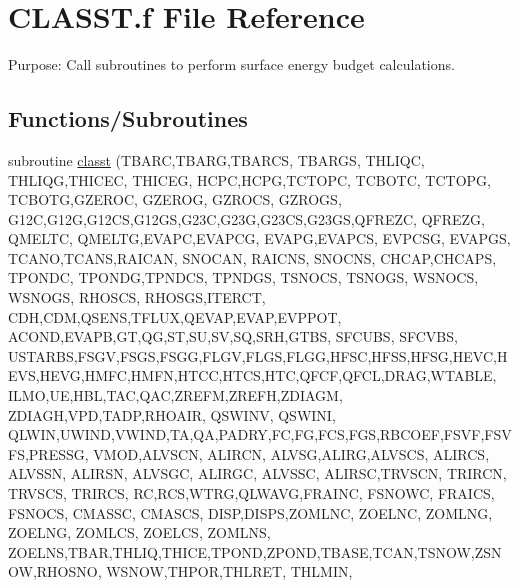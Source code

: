 \hypertarget{CLASST_8f}{}\section{C\+L\+A\+S\+S\+T.\+f File Reference}
\label{CLASST_8f}


Purpose\+: Call subroutines to perform surface energy budget calculations.  


\subsection*{Functions/\+Subroutines}
\begin{DoxyCompactItemize}
\item 
subroutine \hyperlink{CLASST_8f_aae7caf500dbc44213c77f3ff2846253f}{classt} (T\+B\+A\+R\+C,T\+B\+A\+R\+G,T\+B\+A\+R\+C\+S, T\+B\+A\+R\+G\+S, T\+H\+L\+I\+Q\+C, T\+H\+L\+I\+Q\+G,T\+H\+I\+C\+E\+C, T\+H\+I\+C\+E\+G, H\+C\+P\+C,H\+C\+P\+G,T\+C\+T\+O\+P\+C, T\+C\+B\+O\+T\+C, T\+C\+T\+O\+P\+G, T\+C\+B\+O\+T\+G,G\+Z\+E\+R\+O\+C, G\+Z\+E\+R\+O\+G, G\+Z\+R\+O\+C\+S, G\+Z\+R\+O\+G\+S, G12\+C,G12\+G,G12\+C\+S,G12\+G\+S,G23\+C,G23\+G,G23\+C\+S,G23\+G\+S,Q\+F\+R\+E\+Z\+C, Q\+F\+R\+E\+Z\+G, Q\+M\+E\+L\+T\+C, Q\+M\+E\+L\+T\+G,E\+V\+A\+P\+C,E\+V\+A\+P\+C\+G, E\+V\+A\+P\+G,E\+V\+A\+P\+C\+S, E\+V\+P\+C\+S\+G, E\+V\+A\+P\+G\+S, T\+C\+A\+N\+O,T\+C\+A\+N\+S,R\+A\+I\+C\+A\+N, S\+N\+O\+C\+A\+N, R\+A\+I\+C\+N\+S, S\+N\+O\+C\+N\+S, C\+H\+C\+A\+P,C\+H\+C\+A\+P\+S, T\+P\+O\+N\+D\+C, T\+P\+O\+N\+D\+G,T\+P\+N\+D\+C\+S, T\+P\+N\+D\+G\+S, T\+S\+N\+O\+C\+S, T\+S\+N\+O\+G\+S, W\+S\+N\+O\+C\+S, W\+S\+N\+O\+G\+S, R\+H\+O\+S\+C\+S, R\+H\+O\+S\+G\+S,I\+T\+E\+R\+C\+T, C\+D\+H,C\+D\+M,Q\+S\+E\+N\+S,T\+F\+L\+U\+X,Q\+E\+V\+A\+P,E\+V\+A\+P,E\+V\+P\+P\+O\+T, A\+C\+O\+N\+D,E\+V\+A\+P\+B,G\+T,Q\+G,S\+T,S\+U,S\+V,S\+Q,S\+R\+H,G\+T\+B\+S, S\+F\+C\+U\+B\+S, S\+F\+C\+V\+B\+S, U\+S\+T\+A\+R\+B\+S,F\+S\+G\+V,F\+S\+G\+S,F\+S\+G\+G,F\+L\+G\+V,F\+L\+G\+S,F\+L\+G\+G,H\+F\+S\+C,H\+F\+S\+S,H\+F\+S\+G,H\+E\+V\+C,H\+E\+V\+S,H\+E\+V\+G,H\+M\+F\+C,H\+M\+F\+N,H\+T\+C\+C,H\+T\+C\+S,H\+T\+C,Q\+F\+C\+F,Q\+F\+C\+L,D\+R\+A\+G,W\+T\+A\+B\+L\+E, I\+L\+M\+O,U\+E,H\+B\+L,T\+A\+C,Q\+A\+C,Z\+R\+E\+F\+M,Z\+R\+E\+F\+H,Z\+D\+I\+A\+G\+M, Z\+D\+I\+A\+G\+H,V\+P\+D,T\+A\+D\+P,R\+H\+O\+A\+I\+R, Q\+S\+W\+I\+N\+V, Q\+S\+W\+I\+N\+I, Q\+L\+W\+I\+N,U\+W\+I\+N\+D,V\+W\+I\+N\+D,T\+A,Q\+A,P\+A\+D\+R\+Y,F\+C,F\+G,F\+C\+S,F\+G\+S,R\+B\+C\+O\+E\+F,F\+S\+V\+F,F\+S\+V\+F\+S,P\+R\+E\+S\+S\+G, V\+M\+O\+D,A\+L\+V\+S\+C\+N, A\+L\+I\+R\+C\+N, A\+L\+V\+S\+G,A\+L\+I\+R\+G,A\+L\+V\+S\+C\+S, A\+L\+I\+R\+C\+S, A\+L\+V\+S\+S\+N, A\+L\+I\+R\+S\+N, A\+L\+V\+S\+G\+C, A\+L\+I\+R\+G\+C, A\+L\+V\+S\+S\+C, A\+L\+I\+R\+S\+C,T\+R\+V\+S\+C\+N, T\+R\+I\+R\+C\+N, T\+R\+V\+S\+C\+S, T\+R\+I\+R\+C\+S, R\+C,R\+C\+S,W\+T\+R\+G,Q\+L\+W\+A\+V\+G,F\+R\+A\+I\+N\+C, F\+S\+N\+O\+W\+C, F\+R\+A\+I\+C\+S, F\+S\+N\+O\+C\+S, C\+M\+A\+S\+S\+C, C\+M\+A\+S\+C\+S, D\+I\+S\+P,D\+I\+S\+P\+S,Z\+O\+M\+L\+N\+C, Z\+O\+E\+L\+N\+C, Z\+O\+M\+L\+N\+G, Z\+O\+E\+L\+N\+G, Z\+O\+M\+L\+C\+S, Z\+O\+E\+L\+C\+S, Z\+O\+M\+L\+N\+S, Z\+O\+E\+L\+N\+S,T\+B\+A\+R,T\+H\+L\+I\+Q,T\+H\+I\+C\+E,T\+P\+O\+N\+D,Z\+P\+O\+N\+D,T\+B\+A\+S\+E,T\+C\+A\+N,T\+S\+N\+O\+W,Z\+S\+N\+O\+W,R\+H\+O\+S\+N\+O, W\+S\+N\+O\+W,T\+H\+P\+O\+R,T\+H\+L\+R\+E\+T, T\+H\+L\+M\+I\+N, 
\end{DoxyCompactItemize}
